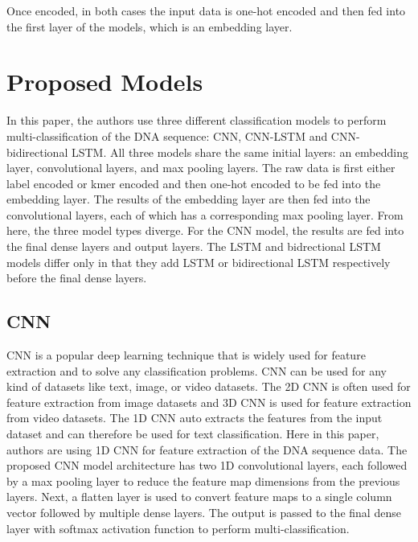 \documentclass[journal]{IEEEtran}
\begin{document}
Once encoded, in both cases the input data is one-hot encoded and then fed into
the first layer of the models, which is an embedding layer.

\section{Proposed Models}
In this paper, the authors use three different classification models to perform multi-classification 
of the DNA sequence: CNN, CNN-LSTM and CNN-bidirectional LSTM.
All three models share the same initial layers: an embedding layer, convolutional layers, and
max pooling layers. The raw data is first either label encoded or kmer encoded and then 
one-hot encoded to be fed into the embedding layer. The results of the embedding layer
are then fed into the convolutional layers, each of which has a corresponding max pooling layer.
From here, the three model types diverge. For the CNN model, the results are fed into
the final dense layers and output layers. The LSTM and bidrectional LSTM models differ only
in that they add LSTM or bidirectional LSTM respectively before the final dense layers. 

\subsection{CNN}
CNN is a popular deep learning technique that is widely used for feature extraction 
and to solve any classification problems. 
CNN can be used for any kind of datasets like text, image, or video datasets. 
The 2D CNN is often used for feature extraction from image datasets and 
3D CNN is used for feature extraction from video datasets. 
The 1D CNN auto extracts the features from the input dataset and can therefore be used 
for text classification. Here in this paper, authors are using 1D CNN for feature extraction 
of the DNA sequence data. The proposed CNN model architecture has two 1D convolutional layers,
each followed by a max pooling layer to reduce the feature map dimensions from the previous layers.
Next, a flatten layer is used to convert feature maps to a single column vector followed by multiple dense layers. 
The output is passed to the final dense layer with softmax activation function to perform multi-classification.
\end{document}
